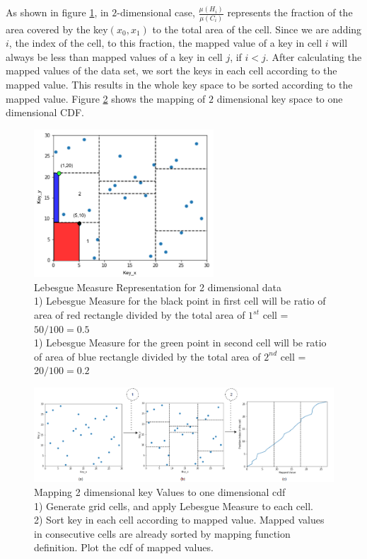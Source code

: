 As shown in figure \ref{fig:Lebesgue_Measure}, in $2$-dimensional case, $\frac {\mu(H_{i})}{\mu(C_{i})}$ represents the fraction of the area covered by the key$(x_{0}, x_{1})$ to the total area of the cell. Since we are adding $i$, the index of the cell, to this fraction, the mapped value of a key in cell $i$ will always be less than mapped values of a key in cell $j$, if $i<j$. After calculating the mapped values of the data set, we sort the keys in each cell according to the mapped value. This results in the whole key space to be sorted according to the mapped value. Figure \ref{fig:Mapped_Cdf} shows the mapping of $2$ dimensional key space to one dimensional CDF.

\begin{figure}[t]
    \centering
    \includegraphics[width=0.6\textwidth]{graphs/implementation/Lebesgue_Measure.pdf}
    \caption{Lebesgue Measure Representation for 2 dimensional data\\
    1) Lebesgue Measure for the black point in first cell will be ratio of area of red rectangle divided by the total area of $1^{st}$ cell = $50/100=0.5$ \\
    1) Lebesgue Measure for the green point in second cell will be ratio of area of blue rectangle divided by the total area of $2^{nd}$ cell = $20/100= 0.2$}
    \label{fig:Lebesgue_Measure}
\end{figure}

\begin{figure}[t]
    \centering
    \includegraphics[width=1\textwidth]{graphs/Mapped_cdf.png}
    \caption{Mapping 2 dimensional key Values to one dimensional cdf\\
    1) Generate grid cells, and apply Lebesgue Measure to each cell.\\
    2) Sort key in each cell according to mapped value. Mapped values in consecutive cells are already sorted by mapping function definition. Plot the cdf of mapped values. }
    \label{fig:Mapped_Cdf}
\end{figure}

